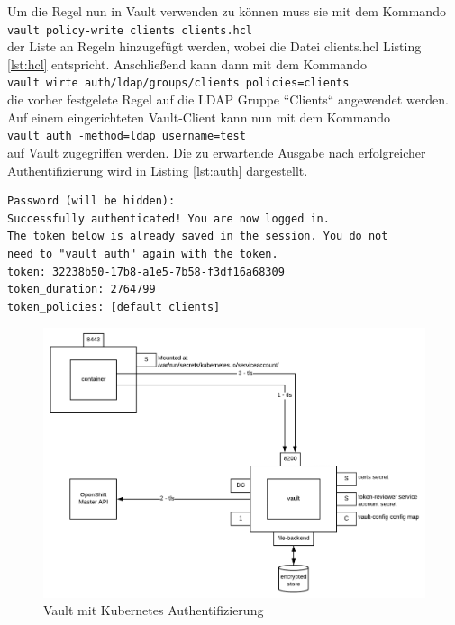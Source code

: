 \documentclass[
book,
a4paper,   
titlepage,  
halfparskip,
12pt        
]{scrartcl}
\newcommand\inline{\lstinline[basicstyle=\ttfamily]}
\begin{document}
\begin{onehalfspacing}
Um die Regel nun in Vault verwenden zu können muss sie mit dem Kommando\\
\inline|vault policy-write clients clients.hcl|\\
der Liste an Regeln hinzugefügt werden, wobei die Datei clients.hcl Listing \vref{lst:hcl} entspricht. Anschließend kann dann  mit dem Kommando\\
\inline|vault wirte auth/ldap/groups/clients policies=clients|\\
die vorher festgelete Regel auf die \ac{LDAP} Gruppe ``Clients`` angewendet werden.\newline
Auf einem eingerichteten Vault-Client kann nun mit dem Kommando\\
\inline|vault auth -method=ldap username=test|\\
auf Vault zugegriffen werden. Die zu erwartende Ausgabe nach erfolgreicher Authentifizierung wird in Listing \vref{lst:auth} dargestellt.\cite{vaultldap}

\begin{lstlisting}[caption={[\acs{LDAP} Authentifizierung] Kommandozeilenausgabe nach erfolgreicher Authentifizierung durch \acs{LDAP}}, label=lst:auth, captionpos=b, basicstyle=\ttfamily] 
Password (will be hidden):
Successfully authenticated! You are now logged in.
The token below is already saved in the session. You do not
need to "vault auth" again with the token.
token: 32238b50-17b8-a1e5-7b58-f3df16a68309
token_duration: 2764799
token_policies: [default clients]
\end{lstlisting}

\begin{figure}[h]
	\centering
	\includegraphics[width=1\linewidth]{kubauth.png}
	\caption[Kubernetes Authentifizierung]{Vault mit Kubernetes Authentifizierung \cite{kubauth}}
	\label{fig:kubauth}
\end{figure}


\end{onehalfspacing}
\end{document}
